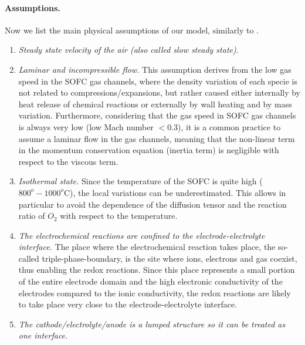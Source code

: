 \documentclass{article}
\begin{document}
 
\paragraph{Assumptions.} Now we list the main physical assumptions of our model, similarly to \cite{bove2008modeling}{.}
\begin{enumerate}[(1)]
\item \textit{Steady state velocity of the air (also called slow steady state)}.

\item \textit{Laminar and incompressible flow.} This assumption derives from the low gas speed in the SOFC gas channels, where the density variation of each specie is not related to compressions/expansions, but rather caused either internally by heat release of chemical reactions or externally by wall heating and by mass variation. Furthermore, considering that the gas speed in SOFC gas channels is always very low (low Mach number $<0.3$), it is a common practice to assume a laminar flow in the gas channels, meaning that the non-linear term in the momentum conservation equation (inertia term) is negligible with respect to the viscous term.

\item \textit{Isothermal state.} Since the temperature of the SOFC is quite high ($800^o-1000^o$C), the local variations can be underestimated. This allows in particular to avoid the dependence of the diffusion tensor and the reaction ratio of $O_2$ with respect to the temperature.

\item \textit{The electrochemical reactions are confined to the electrode-electrolyte interface.} The place where the electrochemical reaction takes place, the so-called triple-phase-boundary, is the site where ions, electrons and gas coexist, thus enabling the redox reactions. Since this place represents a small portion of the entire electrode domain and the high electronic conductivity of the electrodes compared to the ionic conductivity, the redox reactions are likely to take place very close to the electrode-electrolyte interface.

\item \textit{The cathode/electrolyte/anode is a lumped structure so it can be treated as one interface.} 


\end{enumerate}
\end{document}

